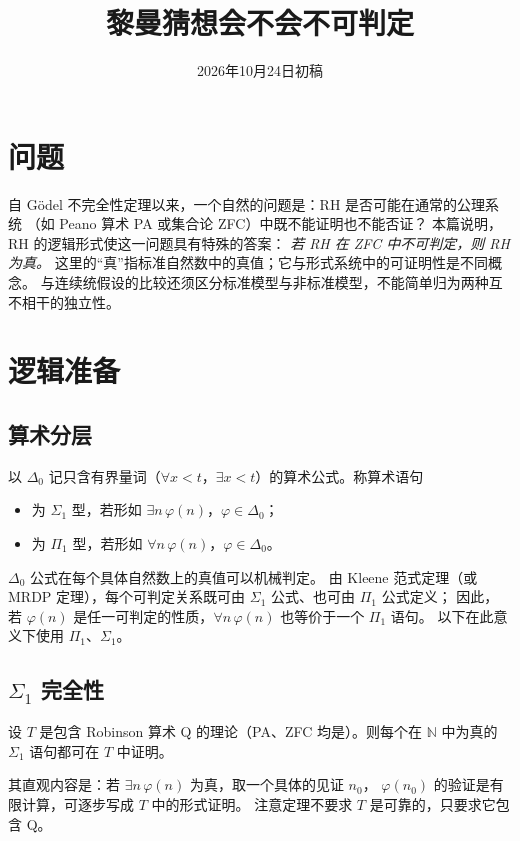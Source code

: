 \documentclass[11pt]{article}
\date{2026年10月24日初稿}
\title{黎曼猜想会不会不可判定}
\begin{document}
\maketitle

\par\medskip

\section{问题}
自 Gödel 不完全性定理以来，一个自然的问题是：RH 是否可能在通常的公理系统
（如 Peano 算术 PA 或集合论 ZFC）中既不能证明也不能否证？
本篇说明，RH 的逻辑形式使这一问题具有特殊的答案：
\emph{若 RH 在 ZFC 中不可判定，则 RH 为真。}
这里的“真”指标准自然数中的真值；它与形式系统中的可证明性是不同概念。
与连续统假设的比较还须区分标准模型与非标准模型，不能简单归为两种互不相干的独立性。

\section{逻辑准备}
\subsection{算术分层}
以 $\Delta_0$ 记只含有界量词（$\forall x<t$，$\exists x<t$）的算术公式。称算术语句
\begin{itemize}
 \item 为 $\Sigma_1$ 型，若形如 $\exists n\,\varphi(n)$，$\varphi\in\Delta_0$；
 \item 为 $\Pi_1$ 型，若形如 $\forall n\,\varphi(n)$，$\varphi\in\Delta_0$。
\end{itemize}
$\Delta_0$ 公式在每个具体自然数上的真值可以机械判定。
由 Kleene 范式定理（或 MRDP 定理），每个可判定关系既可由 $\Sigma_1$ 公式、也可由 $\Pi_1$ 公式定义；
因此，若 $\varphi(n)$ 是任一可判定的性质，$\forall n\,\varphi(n)$ 也等价于一个 $\Pi_1$ 语句。
以下在此意义下使用 $\Pi_1$、$\Sigma_1$。

\subsection{\texorpdfstring{$\Sigma_1$ 完全性}{Sigma-1 完全性}}
\begin{theorem}\label{thm:sigma1}
设 $T$ 是包含 Robinson 算术 Q 的理论（PA、ZFC 均是）。则每个在 $\mathbb N$ 中为真的 $\Sigma_1$ 语句都可在 $T$ 中证明。
\end{theorem}
其直观内容是：若 $\exists n\,\varphi(n)$ 为真，取一个具体的见证 $n_0$，
$\varphi(n_0)$ 的验证是有限计算，可逐步写成 $T$ 中的形式证明。
注意定理不要求 $T$ 是可靠的，只要求它包含 Q。
\end{document}
